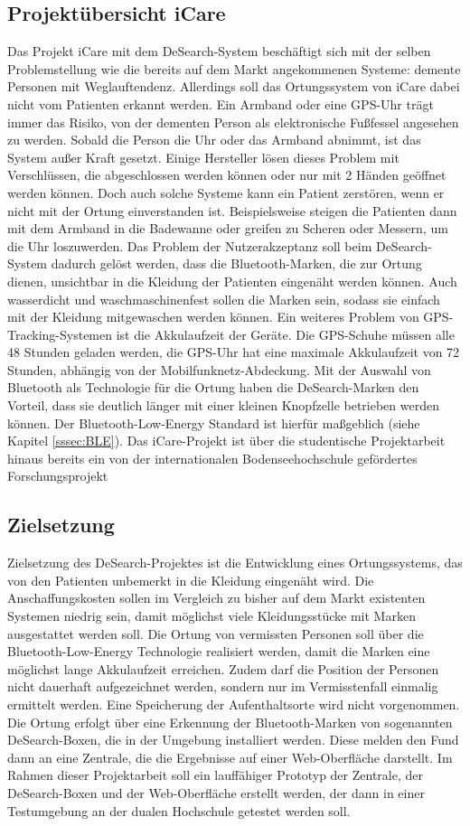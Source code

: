 \subsection{Projektübersicht iCare}
Das Projekt iCare mit dem DeSearch-System beschäftigt sich mit der selben Problemstellung wie die bereits auf dem Markt angekommenen Systeme: demente Personen mit Weglauftendenz. Allerdings soll das Ortungssystem von iCare dabei nicht vom Patienten erkannt werden. Ein Armband oder eine GPS-Uhr trägt immer das Risiko, von der dementen Person als elektronische Fußfessel angesehen zu werden. Sobald die Person die Uhr oder das Armband abnimmt, ist das System außer Kraft gesetzt. Einige Hersteller lösen dieses Problem mit Verschlüssen, die abgeschlossen werden können oder nur mit 2 Händen geöffnet werden können. Doch auch solche Systeme kann ein Patient zerstören, wenn er nicht mit der Ortung einverstanden ist. Beispielsweise steigen die Patienten dann mit dem Armband in die Badewanne oder greifen zu Scheren oder Messern, um die Uhr loszuwerden. Das Problem der Nutzerakzeptanz soll beim DeSearch-System dadurch gelöst werden, dass die Bluetooth-Marken, die zur Ortung dienen, unsichtbar in die Kleidung der Patienten eingenäht werden können. Auch wasserdicht und waschmaschinenfest sollen die Marken sein, sodass sie einfach mit der Kleidung mitgewaschen werden können. Ein weiteres Problem von GPS-Tracking-Systemen ist die Akkulaufzeit der Geräte. Die GPS-Schuhe müssen alle 48 Stunden geladen werden, die GPS-Uhr hat eine maximale Akkulaufzeit von 72 Stunden, abhängig von der Mobilfunknetz-Abdeckung. Mit der Auswahl von Bluetooth als Technologie für die Ortung haben die DeSearch-Marken den Vorteil, dass sie deutlich länger mit einer kleinen Knopfzelle betrieben werden können. Der Bluetooth-Low-Energy Standard ist hierfür maßgeblich (siehe Kapitel \ref{sssec:BLE}). Das iCare-Projekt ist über die studentische Projektarbeit hinaus bereits ein von der internationalen Bodenseehochschule gefördertes Forschungsprojekt \citep[Vgl.][]{icare-dhbw}

\subsection{Zielsetzung}
Zielsetzung des DeSearch-Projektes ist die Entwicklung eines Ortungssystems, das von den Patienten unbemerkt in die Kleidung eingenäht wird. Die Anschaffungskosten sollen im Vergleich zu bisher auf dem Markt existenten Systemen niedrig sein, damit möglichst viele Kleidungsstücke mit Marken ausgestattet werden soll. Die Ortung von vermissten Personen soll über die Bluetooth-Low-Energy Technologie realisiert werden, damit die Marken eine möglichst lange Akkulaufzeit erreichen. Zudem darf die Position der Personen nicht dauerhaft aufgezeichnet werden, sondern nur im Vermisstenfall einmalig ermittelt werden. Eine Speicherung der Aufenthaltsorte wird nicht vorgenommen. Die Ortung erfolgt über eine Erkennung der Bluetooth-Marken von sogenannten DeSearch-Boxen, die in der Umgebung installiert werden. Diese melden den Fund dann an eine Zentrale, die die Ergebnisse auf einer Web-Oberfläche darstellt. Im Rahmen dieser Projektarbeit soll ein lauffähiger Prototyp der Zentrale, der DeSearch-Boxen und der Web-Oberfläche erstellt werden, der dann in einer Testumgebung an der dualen Hochschule getestet werden soll.
